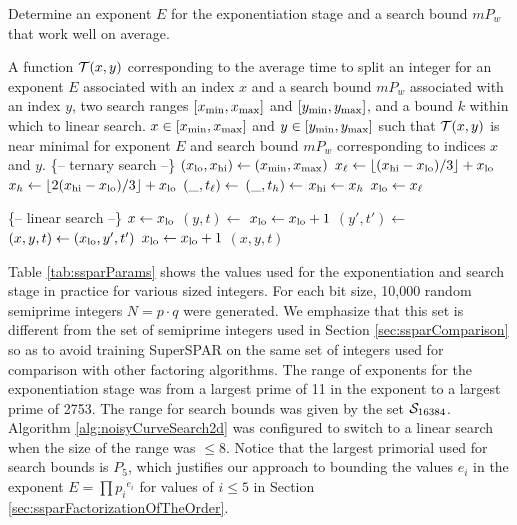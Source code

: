 \documentclass{ucalgthes1}
\theoremstyle{definition}
\newcommand{\floor}[1]{\left\lfloor #1 \right\rfloor}
\begin{document}
\begin{algorithm}[htb]
\caption[2 Dimensional Ternary Search of a Noisy Surface.]{Determine an exponent $E$ for the exponentiation stage and a search bound $mP_w$ that work well on average.}
\label{alg:noisyCurveSearch2d}
\begin{algorithmic}[1]
\Require A function $\mathcal T(x, y)$ corresponding to the average time to split an integer for an exponent $E$ associated with an index $x$ and a search bound $mP_w$ associated with an index $y$,
two search ranges $[x_{\textrm{min}}, x_{\textrm{max}}]$ and $[y_{\textrm{min}}, y_{\textrm{max}}]$,
and a bound $k$ within which to linear search.
\Ensure $x \in [x_{\textrm{min}}, x_{\textrm{max}}]$ and $y \in [y_{\textrm{min}}, y_{\textrm{max}}]$ such that $\mathcal T(x, y)$ is near minimal for exponent $E$ and search bound $mP_w$ corresponding to indices $x$ and $y$.
\Statex \{-- ternary search --\}
\State $(x_{\textrm{lo}}, x_{\textrm{hi}}) \gets (x_{\textrm{min}}, x_{\textrm{max}})$
	\State $\xonethird \gets \floor{(\xhi - \xlo) / 3} + \xlo$
	\State $\xtwothird \gets \floor{2(\xhi - \xlo) / 3} + \xlo$
	\State $(\_, t_\ell) \gets$ 
	\State $(\_, t_h) \gets$ 
	\If{$\tonethird \le \ttwothird$}
		\State $x_{\textrm{hi}} \gets x_h$
	\Else
		\State $x_{\textrm{lo}} \gets x_\ell$
	\EndIf
\EndWhile

\Statex \{-- linear search --\}
\State $x \gets x_{\textrm{lo}}$ 
\State $(y, t) \gets$ 
\State $x_{\textrm{lo}} \gets x_{\textrm{lo}} + 1$
\While{$\xlo \le \xhi$}
	\State $(y', t') \gets$ 
	 $(x, y, t) \gets (x_{\textrm{lo}}, y', t')$ \EndIf
	\State $x_{\textrm{lo}} \gets x_{\textrm{lo}} + 1$
\EndWhile
\State \Return $(x, y, t)$
\EndProcedure
\end{algorithmic}
\end{algorithm}

Table \ref{tab:ssparParams} shows the values used for the exponentiation and search stage in practice for various sized integers. For each bit size, 10,000 random semiprime integers $N = p \cdot q$ were generated.  We emphasize that this set is different from the set of semiprime integers used in Section \ref{sec:ssparComparison} so as to avoid training SuperSPAR on the same set of integers used for comparison with other factoring algorithms.  The range of exponents for the exponentiation stage was from a largest prime of 11 in the exponent to a largest prime of 2753.  The range for search bounds was given by the set $\mathcal S_{16384}$.  Algorithm \ref{alg:noisyCurveSearch2d} was configured to switch to a linear search when the size of the range was $\le 8$.  Notice that the largest primorial used for search bounds is $P_5$, which justifies our approach to bounding the values $e_i$ in the exponent $E = \prod {p_i}^{e_i}$ for values of $i \le 5$ in Section \ref{sec:ssparFactorizationOfTheOrder}.
\end{document}
